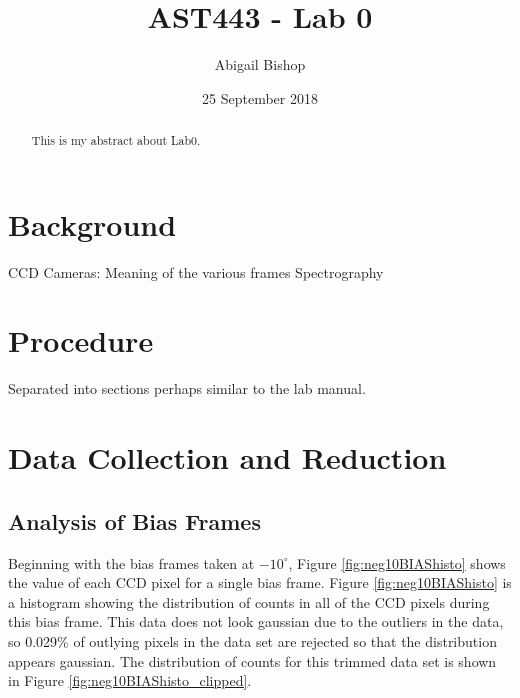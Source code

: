 \documentclass[preprint]{aastex62}
\begin{document}
\title{AST443 - Lab 0}
\author{Abigail Bishop}
\date{25 September 2018}							%

\begin{abstract}
This is my abstract about Lab0. 
\end{abstract}

\newpage

\section{Background}
CCD Cameras: Meaning of the various frames
Spectrography

\section{Procedure}
Separated into sections perhaps similar to the lab manual.

\section{Data Collection and Reduction}
  
  \subsection{Analysis of Bias Frames}
  
    Beginning with the bias frames taken at $-10^{\circ}$, Figure \ref{fig:neg10BIAShisto} shows the value of each CCD pixel for a single bias frame. Figure \ref{fig:neg10BIAShisto} is a histogram showing the distribution of counts in all of the CCD pixels during this bias frame. This data does not look gaussian due to the outliers in the data, so 0.029\% of outlying pixels in the data set are rejected so that the distribution appears gaussian. The distribution of counts for this trimmed data set is shown in Figure \ref{fig:neg10BIAShisto_clipped}. 
    
\end{document}
